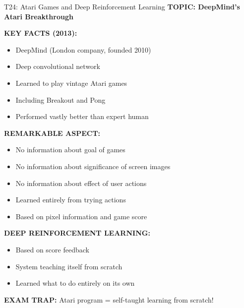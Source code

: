 \documentclass[8pt]{beamer}
\begin{document}
	\begin{frame}{T24: Atari Games and Deep Reinforcement Learning}
		\fontsize{6.5}{7.5}\selectfont
		\textbf{TOPIC: DeepMind's Atari Breakthrough}
		
		\vspace{0.1cm}
		\textbf{KEY FACTS (2013):}
		\begin{itemize}
			\item DeepMind (London company, founded 2010)
			\item Deep convolutional network
			\item Learned to play vintage Atari games
			\item Including Breakout and Pong
			\item Performed vastly better than expert human
		\end{itemize}
		
		\vspace{0.1cm}
		\textbf{REMARKABLE ASPECT:}
		\begin{itemize}
			\item No information about goal of games
			\item No information about significance of screen images
			\item No information about effect of user actions
			\item Learned entirely from trying actions
			\item Based on pixel information and game score
		\end{itemize}
		
		\vspace{0.1cm}
		\textbf{DEEP REINFORCEMENT LEARNING:}
		\begin{itemize}
			\item Based on score feedback
			\item System teaching itself from scratch
			\item Learned what to do entirely on its own
		\end{itemize}
		
		\textcolor{myred}{\textbf{EXAM TRAP:}} Atari program = \textcolor{myblue}{self-taught learning from scratch}!
	\end{frame}
	
\end{document}
